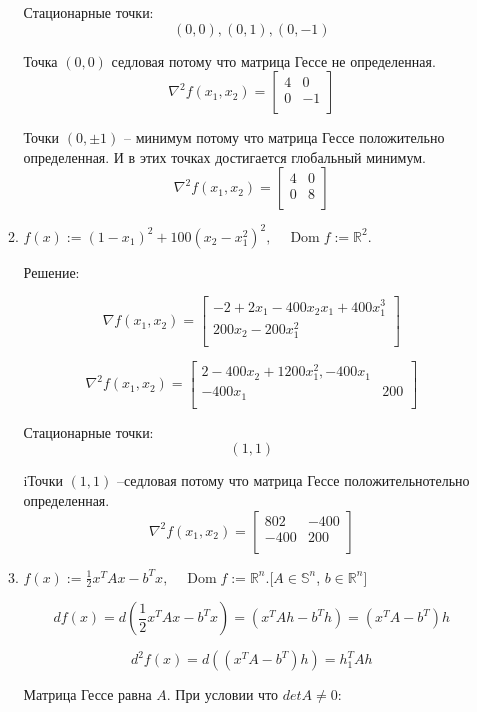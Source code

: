 \documentclass{article}
\newcommand{\R}{\mathbb{R}}
\renewcommand{\S}{\mathbb{S}}
\DeclareMathOperator*{\Dom}{Dom}
\begin{document}
\begin{enumerate}[label=\textbf{\arabic*}, leftmargin=0em]
\begin{enumerate}
Стационарные точки:
$$
(0, 0), (0, 1), (0, -1)
$$

Точка $(0,0)$ седловая потому что матрица Гессе не определенная.
$$
\nabla^2 f(x_1, x_2)  =
\begin{bmatrix}
4 & 0\\
0 & -1\\
\end{bmatrix}
$$

Точки $(0,\pm1)$ -- минимум потому что матрица Гессе положительно определенная. И в этих точках достигается глобальный минимум.
$$
\nabla^2 f(x_1, x_2)  =
\begin{bmatrix}
4 & 0\\
0 & 8\\
\end{bmatrix}
$$


\item $\displaystyle f(x) := (1 - x_1)^2 + 100(x_2 - x_1^2)^2, \quad \Dom f := \R^2$.

Решение:

$$
\nabla f(x_1, x_2)  =
\begin{bmatrix}
-2 + 2x_1 - 400x_2x_1 + 400x_1^3\\
200x_2 - 200x_1^2 \\
\end{bmatrix}
$$


$$
\nabla^2 f(x_1, x_2)  =
\begin{bmatrix}
2 - 400x_2 + 1200x_1^2, -400x_1 \\
-400x_1 & 200\\
\end{bmatrix}
$$

Стационарные точки:
$$
(1, 1)
$$

iТочки $(1, 1)$ --седловая потому что матрица Гессе положительнотельно определенная.
$$
\nabla^2 f(x_1, x_2)  =
\begin{bmatrix}
802 & -400\\
-400 & 200\\
\end{bmatrix}
$$


\item $\displaystyle f(x) := \frac{1}{2} x^T A x - b^T x, \quad \Dom f := \R^n$.\hfill[$A \in \S^n$, $b \in \R^n$]

$$
d f(x) = d(\frac{1}{2} x^T A x - b^T x) = (x^TAh - b^Th) = (x^TA - b^T)h
$$

$$
d^2 f(x) = d((x^TA - b^T)h) = h_1^TAh
$$

Матрица Гессе равна $A$. При условии что $detA \neq 0$:


\end{enumerate}
\end{enumerate}
\end{document}
